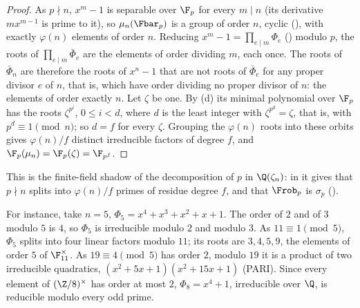 \begin{proof}
As $p\nmid n$, $x^m-1$ is separable over $\F_p$ for every $m\mid n$ (its derivative $mx^{m-1}$ is prime to it), so $\mu_n(\Fbar_p)$ is a group of order $n$, cyclic
(), with exactly $\varphi(n)$ elements of order $n$. Reducing $x^m-1=\prod_{e\mid m}\Phi_e$ () modulo $p$, the roots of
$\prod_{e\mid m}\bar\Phi_e$ are the elements of order dividing $m$, each once. The roots of $\bar\Phi_n$ are therefore the roots of $x^n-1$ that are not roots of
$\bar\Phi_e$ for any proper divisor $e$ of $n$, that is, which have order dividing no proper divisor of $n$: the elements of order exactly $n$. Let $\zeta$ be one.
By (d) its minimal polynomial over $\F_p$ has the roots $\zeta^{p^i}$, $0\le i<d$, where $d$ is the least integer with
$\zeta^{p^d}=\zeta$, that is, with $p^d\equiv1\pmod n$; so $d=f$ for every $\zeta$. Grouping the $\varphi(n)$ roots into these orbits gives $\varphi(n)/f$ distinct
irreducible factors of degree $f$, and $\F_p(\mu_n)=\F_p(\zeta)=\F_{p^f}$.
\end{proof}

This is the finite-field shadow of the decomposition of $p$ in $\Q(\zeta_n)$: in  it gives that $p\nmid n$ splits into $\varphi(n)/f$ primes of
residue degree $f$, and that $\Frob_p$ is $\sigma_p$ ().

For instance, take $n=5$, $\Phi_5=x^4+x^3+x^2+x+1$. The order of $2$ and of $3$ modulo $5$ is $4$, so $\Phi_5$ is irreducible modulo $2$ and modulo $3$. As
$11\equiv1\pmod5$, $\Phi_5$ splits into four linear factors modulo $11$; its roots are $3,4,5,9$, the elements of order $5$ of $\F_{11}^\times$. As $19\equiv4\pmod5$
has order $2$, modulo $19$ it is a product of two irreducible quadratics, $(x^2+5x+1)(x^2+15x+1)$ (PARI). Since every element of $(\Z/8)^\times$ has order at most $2$,
$\Phi_8=x^4+1$, irreducible over $\Q$, is reducible modulo every odd prime.

